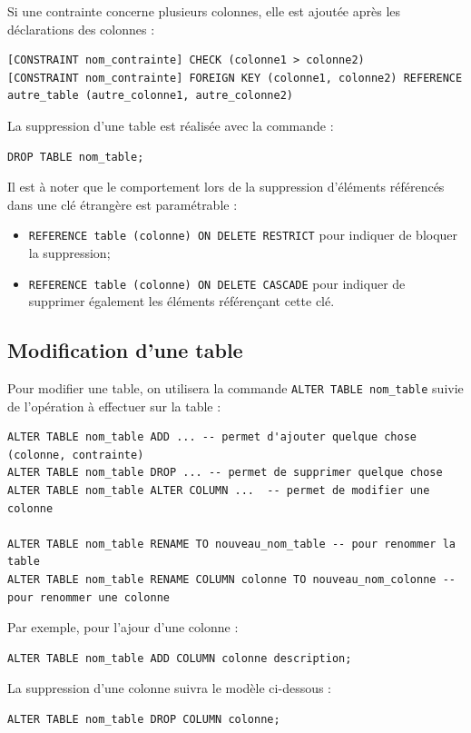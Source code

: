 \documentclass[11pt]{article}
\begin{document}
				Si une contrainte concerne plusieurs colonnes, elle est ajoutée après les déclarations des colonnes :
				\begin{lstlisting}
[CONSTRAINT nom_contrainte] CHECK (colonne1 > colonne2)
[CONSTRAINT nom_contrainte] FOREIGN KEY (colonne1, colonne2) REFERENCE autre_table (autre_colonne1, autre_colonne2)
				\end{lstlisting}
				
				
				La suppression d'une table est réalisée avec la commande :
				\begin{lstlisting}
DROP TABLE nom_table;
				\end{lstlisting}
				
				Il est à noter que le comportement lors de la suppression d'éléments référencés dans une clé étrangère est paramétrable :
				\begin{itemize}
					\item \lstinline{REFERENCE table (colonne) ON DELETE RESTRICT} pour indiquer de bloquer la suppression;
					\item \lstinline{REFERENCE table (colonne) ON DELETE CASCADE} pour indiquer de supprimer également les éléments référençant cette clé.
				\end{itemize}
				
				
			
			\subsection{Modification d'une table}
				Pour modifier une table, on utilisera la commande \lstinline{ALTER TABLE nom_table} suivie de l'opération à effectuer sur la table : 
				\begin{lstlisting}
ALTER TABLE nom_table ADD ... -- permet d'ajouter quelque chose (colonne, contrainte)
ALTER TABLE nom_table DROP ... -- permet de supprimer quelque chose
ALTER TABLE nom_table ALTER COLUMN ...  -- permet de modifier une colonne

ALTER TABLE nom_table RENAME TO nouveau_nom_table -- pour renommer la table
ALTER TABLE nom_table RENAME COLUMN colonne TO nouveau_nom_colonne -- pour renommer une colonne
				\end{lstlisting}
			
			
				Par exemple, pour l'ajour d'une colonne :
				\begin{lstlisting}
ALTER TABLE nom_table ADD COLUMN colonne description;
				\end{lstlisting}
			
				La suppression d'une colonne suivra le modèle ci-dessous :
				\begin{lstlisting}
ALTER TABLE nom_table DROP COLUMN colonne;
				\end{lstlisting}
\end{document}
